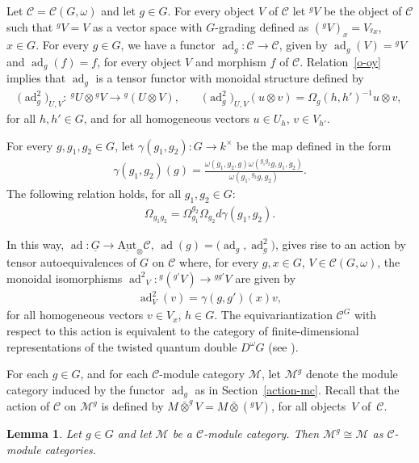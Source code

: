 \documentclass[pdftex]{sigma}
\numberwithin{equation}{section}
\newtheorem{Lemma}[Theorem]{Lemma}
 { \theoremstyle{definition}
\newtheorem{Example}[Theorem]{Example}
\newtheorem{Remark}[Theorem]{Remark} }
\newcommand{\cch}{\Omega}
\newcommand{\oot}{\bar\otimes}
\newcommand{\C}{{\mathcal C}}
\newcommand{\M}{{\mathcal M}}
\newcommand{\1}{\textbf{1}}
\newcommand\ad{\operatorname{ad}}
\begin{document}
Let $\C = \C(G, \omega)$ and let $g \in G$. For every object $V$ of $\C$ let ${}^g V$ be the object of $\C$ such that $^gV = V$ as a vector space with $G$-grading def\/ined as $({}^gV)_x = V_{^g x}$, $x \in G$. For every $g \in G$, we have a functor $\ad_g \colon \C \to \C$, given by $\ad_g(V) = {}^gV$ and $\ad_g(f) = f$, for every object $V$ and morphism $f$ of $\C$.
Relation~\eqref{o-oy} implies that $\ad_g$ is a tensor functor with monoidal structure def\/ined by
\begin{gather*}\big(\ad_g^2\big)_{U, V}\colon \ {}^gU \otimes {}^gV \to {}^g (U \otimes V), \qquad \big(\ad_g^2\big)_{U, V} (u \otimes v) = \cch_g(h, h')^{-1} u\otimes v,\end{gather*}
for all $h, h' \in G$, and for all homogeneous vectors $u \in U_h$, $v \in V_{h'}$.

For every $g, g_1, g_2 \in G$, let $\gamma(g_1, g_2)\colon G \to k^\times$ be the map def\/ined in the form
\begin{gather*}
\gamma(g_1, g_2)(g) = \frac{\omega(g_1, g_2, g) \omega({}^{g_1g_2}g, g_1, g_2)}{\omega(g_1,{}^{g_2}g, g_2)}.
\end{gather*}
The following relation holds, for all $g_1, g_2 \in G$:
\begin{gather}\label{rel-omega}
\cch_{g_1g_2} = \cch_{g_1}^{g_2} \cch_{g_2} d \gamma(g_1, g_2) .
\end{gather}

In this way, $\ad\colon \underline G \to \underline{\text{Aut}}_\otimes\C$, $\ad(g) = \big(\ad_g, \ad_g^2\big)$, gives rise to an action by tensor autoequivalences of $G$ on $\C$ where, for every $g, x \in G$, $V \in \C(G, \omega)$, the monoidal isomorphisms ${\ad^2}_V\colon {}^g({}^{g'}V) \to {}^{gg'}V$ are given by
\begin{gather*}\ad^2_V(v) = \gamma(g, g') (x) v,\end{gather*} for all homogeneous vectors $v \in V_x$, $h \in G$. The equivariantization $\C^G$ with respect to this action is equivalent to the category of f\/inite-dimensional representations of the twisted quantum double $D^\omega G$ (see \cite[Lemma~6.3]{naidu}).

For each $g \in G$, and for each $\C$-module category $\M$, let $\M^g$ denote the module category induced by the functor $\ad_g$ as in Section~\ref{action-mc}. Recall that the action of $\C$ on $\M^g$ is def\/ined by $M\oot^g V = M\oot ({}^gV)$, for all objects~$V$ of~$\C$.

\begin{Lemma}\label{adj-triv} Let $g \in G$ and let $\M$ be a $\C$-module category. Then $\M^g \cong \M$ as $\C$-module categories.
\end{Lemma}
\end{document}
